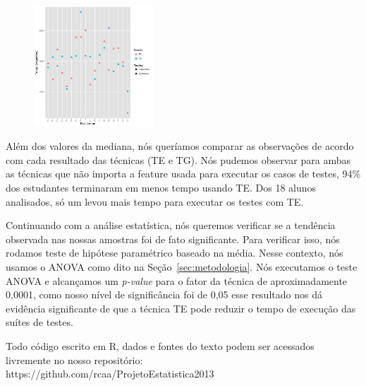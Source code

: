 \begin{figure}[t]
    \centering
    \includegraphics[width=0.4\textwidth]{images/dotplot.png}
    \caption{}
    \label{fig:dotplot}
\end{figure}

Além dos valores da mediana, nós queríamos comparar as observações de acordo com cada resultado das técnicas (TE e TG). Nós pudemos observar para ambas as técnicas que não importa a feature usada para executar os casos de testes, 94\% dos estudantes terminaram em menos tempo usando TE. Dos 18 alunos analisados, só um levou mais tempo para executar os testes com TE.

Continuando com a análise estatística, nós queremos verificar se a tendência
observada nas nossas amostras foi de fato significante. Para verificar isso, nós
rodamos teste de hipótese paramétrico baseado na média. Nesse contexto, nós
usamos o ANOVA como dito na Seção~\ref{sec:metodologia}. Nós executamos o teste
ANOVA e alcançamos um \emph{p-value} para o fator da técnica de
aproximadamente 0,0001, como nosso nível de significância foi de 0,05 esse
resultado nos dá evidência significante de que a técnica TE pode reduzir
o tempo de execução das suítes de testes.

Todo código escrito em R, dados e fontes do texto podem ser acessados livremente no nosso repositório: \\https://github.com/rcaa/ProjetoEstatistica2013